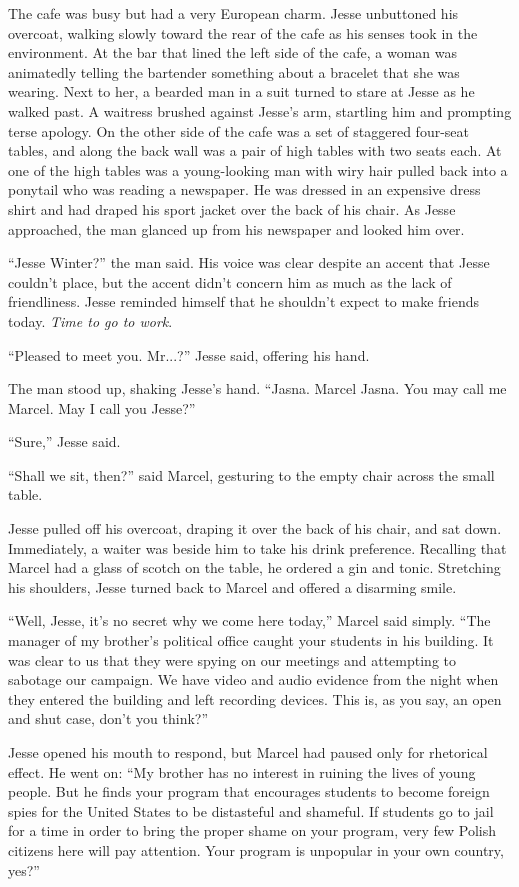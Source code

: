 \documentclass[12pt]{book}
\begin{document}
The cafe was busy but had a very European charm.  Jesse unbuttoned his overcoat, walking slowly toward the rear of the cafe as his senses took in the environment.  At the bar that lined the left side of the cafe, a woman was animatedly telling the bartender something about a bracelet that she was wearing.  Next to her, a bearded man in a suit turned to stare at Jesse as he walked past.  A waitress brushed against Jesse's arm, startling him and prompting terse apology.  On the other side of the cafe was a set of staggered four-seat tables, and along the back wall was a pair of high tables with two seats each.  At one of the high tables was a young-looking man with wiry hair pulled back into a ponytail who was reading a newspaper.  He was dressed in an expensive dress shirt and had draped his sport jacket over the back of his chair.  As Jesse approached, the man glanced up from his newspaper and looked him over.

``Jesse Winter?'' the man said.  His voice was clear despite an accent that Jesse couldn't place, but the accent didn't concern him as much as the lack of friendliness.  Jesse reminded himself that he shouldn't expect to make friends today.  \emph{Time to go to work}.

``Pleased to meet you.  Mr...?'' Jesse said, offering his hand.

The man stood up, shaking Jesse's hand.  ``Jasna.  Marcel Jasna.  You may call me Marcel.  May I call you Jesse?''

``Sure,'' Jesse said.

``Shall we sit, then?'' said Marcel, gesturing to the empty chair across the small table.

Jesse pulled off his overcoat, draping it over the back of his chair, and sat down.  Immediately, a waiter was beside him to take his drink preference.  Recalling that Marcel had a glass of scotch on the table, he ordered a gin and tonic.  Stretching his shoulders, Jesse turned back to Marcel and offered a disarming smile.

``Well, Jesse, it's no secret why we come here today,'' Marcel said simply.  ``The manager of my brother's political office caught your students in his building.  It was clear to us that they were spying on our meetings and attempting to sabotage our campaign.  We have video and audio evidence from the night when they entered the building and left recording devices.  This is, as you say, an open and shut case, don't you think?''

Jesse opened his mouth to respond, but Marcel had paused only for rhetorical effect.  He went on: ``My brother has no interest in ruining the lives of young people.  But he finds your program that encourages students to become foreign spies for the United States to be distasteful and shameful.  If students go to jail for a time in order to bring the proper shame on your program, very few Polish citizens here will pay attention.  Your program is unpopular in your own country, yes?''
\end{document}
